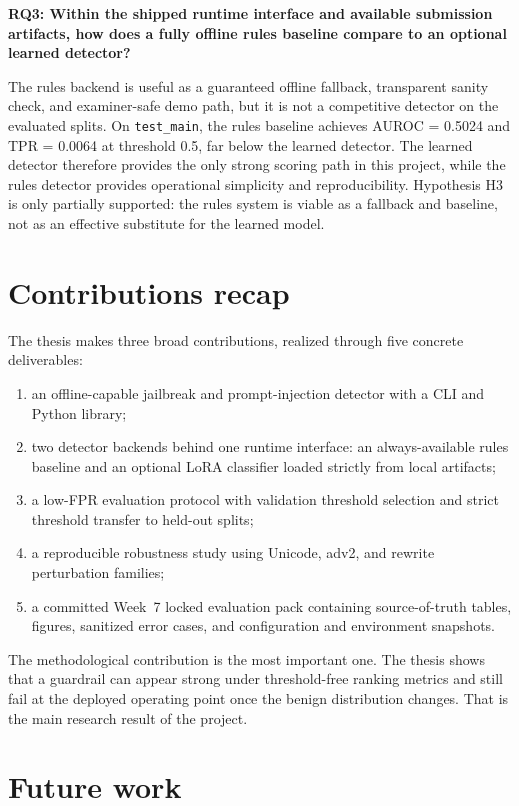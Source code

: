 \textbf{RQ3: Within the shipped runtime interface and available submission artifacts, how does a fully offline rules baseline compare to an optional learned detector?}

The rules backend is useful as a guaranteed offline fallback, transparent sanity check, and examiner-safe demo path, but it is not a competitive detector on the evaluated splits. On \texttt{test\_main}, the rules baseline achieves AUROC = 0.5024 and TPR = 0.0064 at threshold 0.5, far below the learned detector. The learned detector therefore provides the only strong scoring path in this project, while the rules detector provides operational simplicity and reproducibility. Hypothesis H3 is only partially supported: the rules system is viable as a fallback and baseline, not as an effective substitute for the learned model.

\section{Contributions recap}

The thesis makes three broad contributions, realized through five concrete deliverables:
\begin{enumerate}
  \item an offline-capable jailbreak and prompt-injection detector with a CLI and Python library;
  \item two detector backends behind one runtime interface: an always-available rules baseline and an optional LoRA classifier loaded strictly from local artifacts;
  \item a low-FPR evaluation protocol with validation threshold selection and strict threshold transfer to held-out splits;
  \item a reproducible robustness study using Unicode, adv2, and rewrite perturbation families;
  \item a committed Week~7 locked evaluation pack containing source-of-truth tables, figures, sanitized error cases, and configuration and environment snapshots.
\end{enumerate}

The methodological contribution is the most important one. The thesis shows that a guardrail can appear strong under threshold-free ranking metrics and still fail at the deployed operating point once the benign distribution changes. That is the main research result of the project.

\section{Future work}

